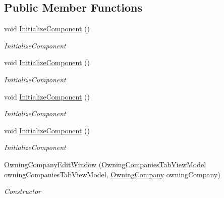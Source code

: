 \subsection*{Public Member Functions}
\begin{DoxyCompactItemize}
\item 
void \hyperlink{class_baudi_1_1_client_1_1_view_1_1_edit_windows_1_1_owning_company_edit_window_a673c67401c64603715801b451d06bb4b}{Initialize\+Component} ()
\begin{DoxyCompactList}\small\item\em Initialize\+Component \end{DoxyCompactList}\item 
void \hyperlink{class_baudi_1_1_client_1_1_view_1_1_edit_windows_1_1_owning_company_edit_window_a673c67401c64603715801b451d06bb4b}{Initialize\+Component} ()
\begin{DoxyCompactList}\small\item\em Initialize\+Component \end{DoxyCompactList}\item 
void \hyperlink{class_baudi_1_1_client_1_1_view_1_1_edit_windows_1_1_owning_company_edit_window_a673c67401c64603715801b451d06bb4b}{Initialize\+Component} ()
\begin{DoxyCompactList}\small\item\em Initialize\+Component \end{DoxyCompactList}\item 
void \hyperlink{class_baudi_1_1_client_1_1_view_1_1_edit_windows_1_1_owning_company_edit_window_a673c67401c64603715801b451d06bb4b}{Initialize\+Component} ()
\begin{DoxyCompactList}\small\item\em Initialize\+Component \end{DoxyCompactList}\item 
\hyperlink{class_baudi_1_1_client_1_1_view_1_1_edit_windows_1_1_owning_company_edit_window_aecb7f7bb28d5a67bf1b09bb6857f1dbf}{Owning\+Company\+Edit\+Window} (\hyperlink{class_baudi_1_1_client_1_1_view_models_1_1_tabs_view_models_1_1_owning_companies_tab_view_model}{Owning\+Companies\+Tab\+View\+Model} owning\+Companies\+Tab\+View\+Model, \hyperlink{class_baudi_1_1_d_a_l_1_1_models_1_1_owning_company}{Owning\+Company} owning\+Company)
\begin{DoxyCompactList}\small\item\em Constructor \end{DoxyCompactList}\end{DoxyCompactItemize}


